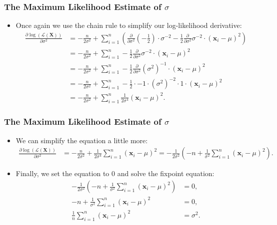 \begin{frame}
  \frametitle{The Maximum Likelihood Estimate of $\sigma$}
  \begin{itemize}
  \item Once again we use the chain rule to simplify our log-likelihood derivative:
    \begin{align}
      \frac{\partial \log\left(\mathcal{L}(\mathbf{X})\right)}{\partial \sigma^2} &= -\frac{n}{2\sigma^2} + \sum_{i=1}^{n} \left(\frac{\partial}{\partial\sigma^2} \left(-\frac{1}{2} \right) \cdot \sigma^{-2} - \frac{1}{2} \frac{\partial}{\partial\sigma^2} \sigma^{-2} \cdot (\mathbf{x}_i-\mu)^2\right) \\
                                                                                  &=  -\frac{n}{2\sigma^2} + \sum_{i=1}^{n} - \frac{1}{2} \frac{\partial}{\partial\sigma^2} \sigma^{-2} \cdot (\mathbf{x}_i-\mu)^2 \\
                                                                                  &=  -\frac{n}{2\sigma^2} + \sum_{i=1}^{n} - \frac{1}{2} \frac{\partial}{\partial\sigma^2} (\sigma^{2})^{-1} \cdot (\mathbf{x}_i-\mu)^2 \\
                                                                                  &=  -\frac{n}{2\sigma^2} + \sum_{i=1}^{n} - \frac{1}{2} \cdot -1 \cdot (\sigma^{2})^{-2} \cdot 1 \cdot (\mathbf{x}_i-\mu)^2\\
                                                                                  &=  -\frac{n}{2\sigma^2} + \sum_{i=1}^{n} \frac{1}{2\sigma^4} (\mathbf{x}_i-\mu)^2.
    \end{align}
  \end{itemize}
\end{frame}


\begin{frame}
  \frametitle{The Maximum Likelihood Estimate of $\sigma$}
  \begin{itemize}
  \item We can simplify the equation a little more:
    \begin{align}
      \frac{\partial \log\left(\mathcal{L}(\mathbf{X})\right)}{\partial \sigma^2} &= -\frac{n}{2\sigma^2} + \frac{1}{2\sigma^4} \sum_{i=1}^{n} (\mathbf{x}_i-\mu)^2 = -\frac{1}{2\sigma^2} \left( -n + \frac{1}{\sigma^2} \sum_{i=1}^{n} (\mathbf{x}_i-\mu)^2\right).
    \end{align}
  \item Finally, we set the equation to $0$ and solve the fixpoint equation:
    \begin{align}
      -\frac{1}{2\sigma^2} \left( -n + \frac{1}{\sigma^2} \sum_{i=1}^{n} (\mathbf{x}_i-\mu)^2\right) &= 0, \\
      -n + \frac{1}{\sigma^2} \sum_{i=1}^{n} (\mathbf{x}_i-\mu)^2 &= 0, \\
      \frac{1}{n} \sum_{i=1}^{n} (\mathbf{x}_i-\mu)^2 &= \sigma^2.
    \end{align}
  \end{itemize}
\end{frame}


